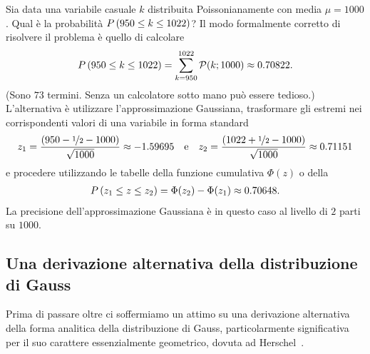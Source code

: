 \begin{examplebox}
  \begin{example}
    Sia data una variabile casuale $k$ distribuita Poissonianamente con
    media $\mu = 1000$. Qual è la probabilità $\displaystyle P\left(950 \leq k \leq 1022\right)$?
    Il modo formalmente corretto di risolvere il problema è quello di
    calcolare
    \begin{align*}
      \prob{950 \leq k \leq 1022} = \sum_{k = 950}^{1022} \poissonpdf[1000]{k}
      \approx 0.70822.
    \end{align*}
    (Sono $73$ termini. Senza un calcolatore sotto mano può essere tedioso.)
    L'alternativa è utilizzare l'approssimazione Gaussiana, trasformare gli
    estremi nei corrispondenti valori di una variabile in forma standard
    \begin{align*}
      z_1 = \frac{(950 - \nicefrac{1}{2} - 1000)}{\sqrt{1000}} \approx -1.59695
      \quad \text{e} \quad
      z_2 = \frac{(1022 + \nicefrac{1}{2} - 1000)}{\sqrt{1000}} \approx 0.71151
    \end{align*}
    e procedere utilizzando le tabelle della funzione cumulativa $\Phi(z)$ o
    della \errorfunc
    \begin{align*}
      \displaystyle P\left(z_1 \leq z \leq z_2\right) = \Phi(z_2) - \Phi(z_1) \approx 0.70648.
    \end{align*}
    La precisione dell'approssimazione Gaussiana è in questo caso al livello
    di $2$ parti su $1000$.
  \end{example}
\end{examplebox}


\subsection{Una derivazione alternativa della distribuzione di Gauss}

Prima di passare oltre ci soffermiamo un attimo su una derivazione alternativa
della forma analitica della distribuzione di Gauss, particolarmente
significativa per il suo carattere essenzialmente geometrico, dovuta ad
Herschel~\cite{herschel}.

